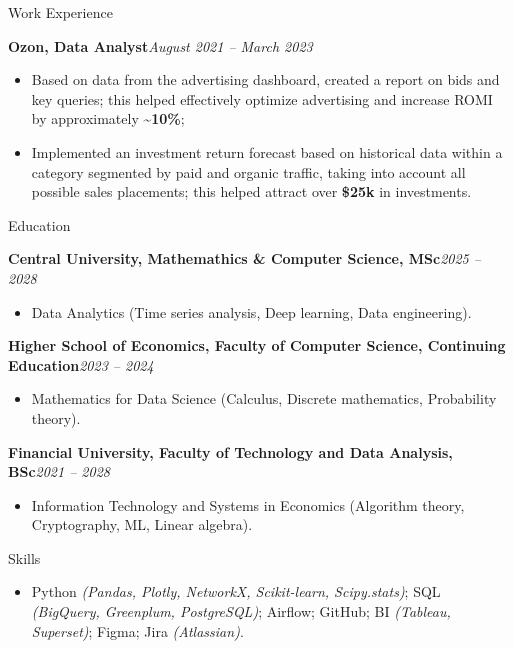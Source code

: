 \documentclass[]{mcdowellcv}
\renewenvironment{cvsubsection}[2]{%
  \begin{adjustwidth}{\subsectionmargin}{\subsectionmargin}%
    {\bfseries #1}\hfill #2\par\vspace{0.5em}%
}{%
  \end{adjustwidth}%
  \vspace*{\aftersubsectionspace}%
}
\begin{document}
\begin{cvsection}{\Large Work Experience}
		\begin{cvsubsection}{Ozon, Data Analyst}{\textit{August 2021 -- March 2023}}
			\begin{itemize}
				\item Based on data from the advertising dashboard, created a report on bids and key queries; this helped effectively optimize advertising and increase ROMI by approximately \textbf{\textasciitilde 10\%};
				\item Implemented an investment return forecast based on historical data within a category segmented by paid and organic traffic, taking into account all possible sales placements; this helped attract over \textbf{\$25k} in investments.
			\end{itemize}
		\end{cvsubsection}
	\end{cvsection}
	
	\begin{cvsection}{\Large Education}
		\begin{cvsubsection}{Central University, Mathemathics \& Computer Science, MSc}{\textit{2025 -- 2028}}
			\begin{itemize}
				\item Data Analytics (Time series analysis, Deep learning, Data engineering).
			\end{itemize}
		\end{cvsubsection}
		\begin{cvsubsection}{Higher School of Economics, Faculty of Computer Science, Continuing Education}{\textit{2023 -- 2024}}
			\begin{itemize}
				\item Mathematics for Data Science (Calculus, Discrete mathematics, Probability theory).
			\end{itemize}
		\end{cvsubsection}
		\begin{cvsubsection}{Financial University, Faculty of Technology and Data Analysis, BSc}{\textit{2021 -- 2028}}
			\begin{itemize}
				\item Information Technology and Systems in Economics (Algorithm theory, Cryptography, ML, Linear algebra).
			\end{itemize}
		\end{cvsubsection}
	\end{cvsection}
	
	\begin{cvsection}{\Large Skills}
		\begin{cvsubsection}{}{}{}	
			\begin{itemize}
				\item Python \textit{(Pandas, Plotly, NetworkX, Scikit-learn, Scipy.stats)}; SQL \textit{(BigQuery, Greenplum, PostgreSQL)}; Airflow; GitHub; BI \textit{(Tableau, Superset)}; Figma; Jira \textit{(Atlassian)}. 
			\end{itemize}
		\end{cvsubsection}
	\end{cvsection}
	
\end{document}
